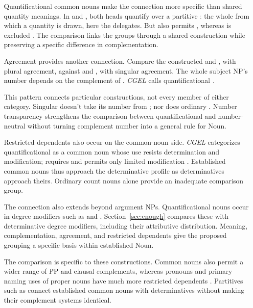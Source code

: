 \documentclass[12pt]{article}
\begin{document}
Quantificational common nouns make the connection more specific than shared quantity meanings. In  and , both heads quantify over a partitive : the whole from which a quantity is drawn, here the delegates. But  also permits , whereas  is excluded \citep[349]{huddleston2002}. The comparison links the groups through a shared construction while preserving a specific difference in complementation.

Agreement provides another connection. Compare the constructed  and , with plural agreement, against  and , with singular agreement. The whole subject NP's number depends on the complement of . \textit{CGEL} calls quantificational   \citep[349--350, 411--412]{huddleston2002}.

This pattern connects particular constructions, not every member of either category. Singular  doesn't take its number from ; nor does ordinary . Number transparency strengthens the comparison between quantificational  and number-neutral  without turning complement number into a general rule for Noun.

Restricted dependents also occur on the common-noun side. \textit{CGEL} categorizes quantificational  as a common noun whose use resists determination and modification;  requires  and permits only limited modification \citep[349--350]{huddleston2002}. Established common nouns thus approach the determinative profile as determinatives approach theirs. Ordinary count nouns alone provide an inadequate comparison group.

The connection also extends beyond argument NPs. Quantificational nouns occur in degree modifiers such as  and  \citep[549--550]{huddleston2002}. Section~\ref{sec:enough} compares these with determinative degree modifiers, including their attributive distribution. Meaning, complementation, agreement, and restricted dependents give the proposed grouping a specific basis within established Noun.

The comparison is specific to these constructions. Common nouns also permit a wider range of PP and clausal complements, whereas pronouns and primary naming uses of proper nouns have much more restricted dependents \citep[429--430, 439--443, 517--521]{huddleston2002}. Partitives such as  connect established common nouns with determinatives without making their complement systems identical.
\end{document}
